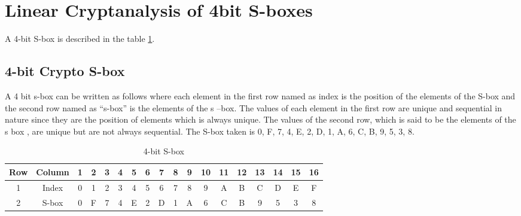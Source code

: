 \documentclass[12pt]{article}
\begin{document}
\section{Linear Cryptanalysis of 4bit S-boxes}
A 4-bit S-box is described in the table \ref{table:6}. 
\subsection{4-bit Crypto S-box}
A 4 bit s-box can be written as follows where each element in the first row named as index is the position of the elements of the S-box and the second row named as “s-box” is the elements of the s –box. The values of each element in the first row are unique and sequential in nature since they are the position of elements which is always unique. The values of the second row, which is said to be the elements of the s box , are unique but are not always sequential. The S-box taken is 0, F, 7, 4, E, 2, D, 1, A, 6, C, B, 9, 5, 3, 8. 
\begin{table}[H]
    \centering
    \begin{tabular}{|c|c|c|c|c|c|c|c|c|c|c|c|c|c|c|c|c|c|}
        \hline
        Row & Column & 1 & 2 & 3 & 4 & 5 & 6 & 7 & 8 & 9 & 10 & 11 & 12 & 13 & 14 & 15 & 16 \\
        \hline
        1 & Index & 0 & 1 & 2 & 3 & 4 & 5 & 6 & 7 & 8 & 9 & A & B & C & D & E & F \\
        \hline
        2 & S-box & 0 & F & 7 & 4 & E & 2 & D & 1 & A & 6 & C & B & 9 & 5 & 3 & 8 \\ 
        \hline
    \end{tabular}
    \caption{4-bit S-box}
    \label{table:6}
\end{table}
\end{document}
